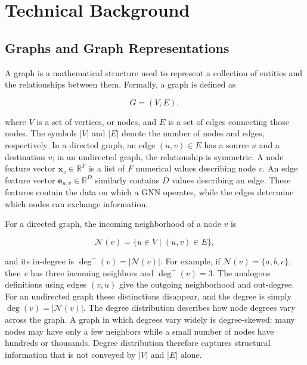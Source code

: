 \section{Technical Background}
\label{sec:technical-background}

\subsection{Graphs and Graph Representations}
\label{sec:graphs-and-representations}

A graph is a mathematical structure used to represent a collection of entities
and the relationships between them. Formally, a graph is defined as

\begin{equation}
  G = (V, E),
  \label{eq:graph-definition}
\end{equation}

where $V$ is a set of vertices, or nodes, and $E$ is a set of edges connecting
those nodes. The symbols $|V|$ and $|E|$ denote the number of nodes and edges,
respectively. In a directed graph, an edge $(u,v) \in E$ has a source $u$ and a
destination $v$; in an undirected graph, the relationship is symmetric. A node
feature vector $\mathbf{x}_v \in \mathbb{R}^{F}$ is a list of $F$ numerical
values describing node $v$. An edge feature vector
$\mathbf{e}_{u,v} \in \mathbb{R}^{D}$ similarly contains $D$ values describing
an edge. These features contain the data on which a GNN operates, while the
edges determine which nodes can exchange information.

For a directed graph, the incoming neighborhood of a node $v$ is

\begin{equation}
  \mathcal{N}(v) = \{u \in V \mid (u,v) \in E\},
  \label{eq:incoming-neighborhood}
\end{equation}

and its in-degree is $\deg^{-}(v)=|\mathcal{N}(v)|$. For example, if
$\mathcal{N}(v)=\{a,b,c\}$, then $v$ has three incoming neighbors and
$\deg^{-}(v)=3$. The analogous definitions using edges $(v,u)$ give the
outgoing neighborhood and out-degree. For an undirected graph these
distinctions disappear, and the degree is simply
$\deg(v)=|\mathcal{N}(v)|$. The degree distribution describes how node degrees
vary across the graph. A graph in which degrees vary widely is
degree-skewed: many nodes may have only a few neighbors while a small number of
nodes have hundreds or thousands. Degree distribution therefore captures
structural information that is not conveyed by $|V|$ and $|E|$ alone.

